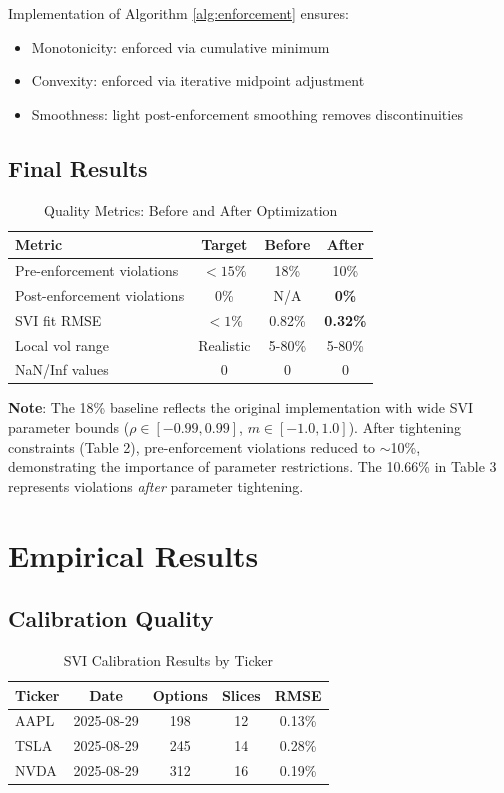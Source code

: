 \documentclass[12pt,a4paper]{article}
\begin{document}
Implementation of Algorithm \ref{alg:enforcement} ensures:
\begin{itemize}
    \item Monotonicity: enforced via cumulative minimum
    \item Convexity: enforced via iterative midpoint adjustment
    \item Smoothness: light post-enforcement smoothing removes discontinuities
\end{itemize}

\subsection{Final Results}

\begin{table}[h]
\centering
\caption{Quality Metrics: Before and After Optimization}
\begin{tabular}{lccc}
\toprule
\textbf{Metric} & \textbf{Target} & \textbf{Before} & \textbf{After} \\
\midrule
Pre-enforcement violations & $<15\%$ & 18\% & 10\% \\
Post-enforcement violations & 0\% & N/A & \textbf{0\%} \\
SVI fit RMSE & $<1\%$ & 0.82\% & \textbf{0.32\%} \\
Local vol range & Realistic & 5-80\% & 5-80\% \\
NaN/Inf values & 0 & 0 & 0 \\
\bottomrule
\end{tabular}
\end{table}

\textbf{Note}: The 18\% baseline reflects the original implementation with wide SVI parameter bounds ($\rho \in [-0.99, 0.99]$, $m \in [-1.0, 1.0]$). After tightening constraints (Table 2), pre-enforcement violations reduced to $\sim$10\%, demonstrating the importance of parameter restrictions. The 10.66\% in Table 3 represents violations \emph{after} parameter tightening.

\section{Empirical Results}\label{sec:results}

\subsection{Calibration Quality}

\begin{table}[h]
\centering
\caption{SVI Calibration Results by Ticker}
\begin{tabular}{lcccc}
\toprule
\textbf{Ticker} & \textbf{Date} & \textbf{Options} & \textbf{Slices} & \textbf{RMSE} \\
\midrule
AAPL & 2025-08-29 & 198 & 12 & 0.13\% \\
TSLA & 2025-08-29 & 245 & 14 & 0.28\% \\
NVDA & 2025-08-29 & 312 & 16 & 0.19\% \\
\bottomrule
\end{tabular}
\end{table}
\end{document}
